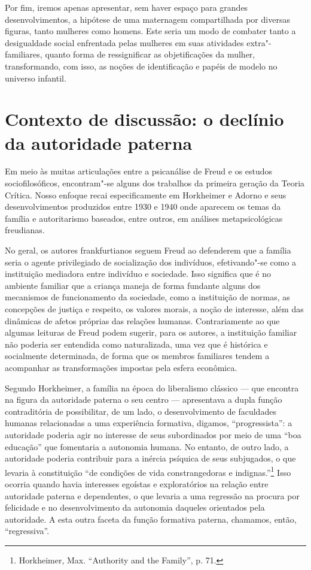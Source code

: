 Por fim, iremos apenas apresentar, sem haver espaço para grandes
desenvolvimentos, a hipótese de uma maternagem compartilhada por
diversas figuras, tanto mulheres como homens. Este seria um modo de
combater tanto a desigualdade social enfrentada pelas mulheres em suas
atividades extra"-familiares, quanto forma de ressignificar as
objetificações da mulher, transformando, com isso, as noções de
identificação e papéis de modelo no universo infantil.

\section{Contexto de discussão: o declínio da autoridade paterna }

Em meio às muitas articulações entre a psicanálise de Freud e os estudos
sociofilosóficos, encontram"-se alguns dos trabalhos da primeira geração
da Teoria Crítica. Nosso enfoque recai especificamente em Horkheimer e
Adorno e seus desenvolvimentos produzidos entre 1930 e 1940 onde
aparecem os temas da família e autoritarismo baseados, entre outros, em
análises metapsicológicas freudianas.

No geral, os autores frankfurtianos seguem Freud ao defenderem que a
família seria o agente privilegiado de socialização dos indivíduos,
efetivando"-se como a instituição mediadora entre indivíduo e sociedade.
Isso significa que é no ambiente familiar que a criança maneja de forma
fundante alguns dos mecanismos de funcionamento da sociedade, como a
instituição de normas, as concepções de justiça e respeito, os valores
morais, a noção de interesse, além das dinâmicas de afetos próprias das
relações humanas. Contrariamente ao que algumas leituras de Freud podem
sugerir, para os autores, a instituição familiar não poderia ser
entendida como naturalizada, uma vez que é histórica e socialmente
determinada, de forma que os membros familiares tendem a acompanhar as
transformações impostas pela esfera econômica.

Segundo Horkheimer, a família na época do liberalismo clássico --- que
encontra na figura da autoridade paterna o seu centro --- apresentava a
dupla função contraditória de possibilitar, de um lado, o
desenvolvimento de faculdades humanas relacionadas a uma experiência
formativa, digamos, ``progressista'': a autoridade poderia agir no
interesse de seus subordinados por meio de uma ``boa educação'' que
fomentaria a autonomia humana. No entanto, de outro lado, a autoridade
poderia contribuir para a inércia psíquica de seus subjugados, o que
levaria à constituição ``de condições de vida constrangedoras e
indignas.''\footnote{Horkheimer, Max. ``Authority and the Family'', p.
  71.} Isso ocorria quando havia interesses egoístas e exploratórios na
relação entre autoridade paterna e dependentes, o que levaria a uma
regressão na procura por felicidade e no desenvolvimento da autonomia
daqueles orientados pela autoridade. A esta outra faceta da função
formativa paterna, chamamos, então, ``regressiva''.

